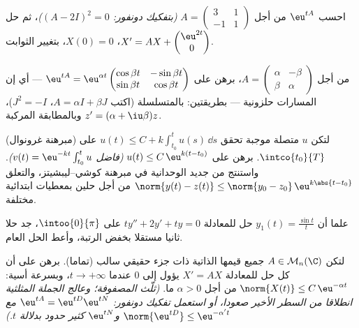 \begin{exercise}[$\star\star$]\label{exo:b2:diffeq:4}
احسب $\eu^{tA}$ من أجل $A = \begin{pmatrix} 3 & 1\\ -1 &
1\end{pmatrix}$ \emph{(بتفكيك دونفور: $(A - 2I)^2 = 0$)}، ثم حل
$X' =
AX + \begin{pmatrix} \eu^{2t}\\ 0\end{pmatrix}$، $X(0) = 0$، بتغيير الثوابت.
\end{exercise}

\begin{exercise}[$\star\star$]\label{exo:b2:diffeq:5}
من أجل $A = \begin{pmatrix} \alpha & -\beta\\ \beta &
\alpha\end{pmatrix}$، برهن على $\eu^{tA} =
\eu^{\alpha t}\begin{pmatrix} \cos\beta t & -\sin\beta t\\
\sin\beta t & \cos\beta t\end{pmatrix}$ --- أي إن المسارات حلزونية ---
بطريقتين: بالمتسلسلة (اكتب $A = \alpha I + \beta J$، $J^2 =
-I$)، وبالمطابقة المركبة
$z' = (\alpha +
\iu\beta)z$.
\end{exercise}

\begin{exercise}[$\star\star$]\label{exo:b2:diffeq:6}
(مبرهنة غرونوال) لتكن $u$ متصلة موجبة تحقق $u(t)
\leq C + k\int_{t_0}^{t} u(s)\,\dd s$ على $\intco{t_0}{T}$.
برهن على $u(t) \leq C\,\eu^{k(t - t_0)}$ \emph{(فاضل $v(t) =
\eu^{-kt}\int_{t_0}^t u$)}. واستنتج من جديد الوحدانية في
مبرهنة كوشي--ليبشيتز، والتعلق  $\norm{y(t) -
z(t)} \leq \norm{y_0 - z_0}\,\eu^{k\abs{t - t_0}}$ من أجل حلين بمعطيات
ابتدائية مختلفة.
\end{exercise}

\begin{exercise}[$\star\star$]\label{exo:b2:diffeq:7}
علما أن $y_1(t) = \frac{\sin t}{t}$ حل للمعادلة $ty'' + 2y' + ty =
0$ على $\intoo{0}{\pi}$، جد حلا ثانيا مستقلا
بخفض الرتبة، وأعط الحل العام.
\end{exercise}

\begin{exercise}[$\star\star\star$]\label{exo:b2:diffeq:8}
لتكن $A \in \mathcal{M}_n(\C)$ جميع قيمها الذاتية ذات جزء حقيقي سالب (تماما). برهن على
أن كل حل للمعادلة $X' = AX$ يؤول إلى $0$ عندما $t \to +\infty$، وبسرعة
أسية: $\norm{X(t)}
\leq C\,\eu^{-\alpha t}$ من أجل $\alpha > 0$ ما.
\emph{(ثلّث المصفوفة؛ وعالج الجملة المثلثية انطلاقا من السطر الأخير
صعودا، أو استعمل تفكيك دونفور: $\eu^{tA} = \eu^{tD}\eu^{tN}$ مع $\norm{\eu^{tD}} \leq \eu^{-\alpha' t}$ و$\eu^{tN}$ كثير حدود
بدلالة $t$.)}
\end{exercise}

